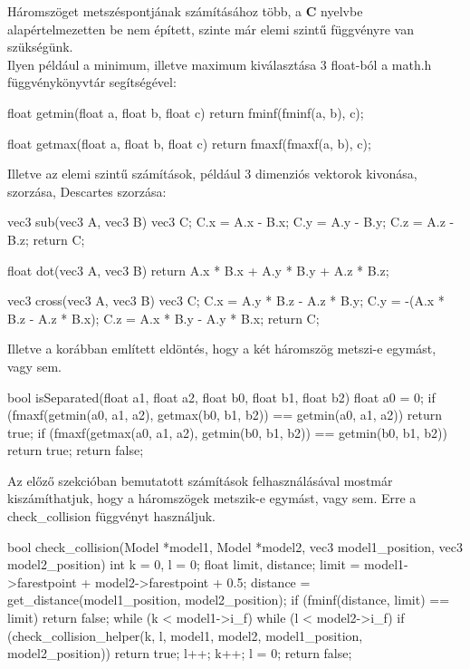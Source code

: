 Háromszöget metszéspontjának számításához több, a \textbf{C} nyelvbe alapértelmezetten be nem épített, szinte már elemi szintű függvényre van szükségünk. \\
Ilyen például a minimum, illetve maximum kiválasztása 3 float-ból a math.h függvénykönyvtár segítségével:

\begin{cpp}
float getmin(float a, float b, float c)
{
    return fminf(fminf(a, b), c);
}

float getmax(float a, float b, float c)
{
    return fmaxf(fmaxf(a, b), c);
}
\end{cpp}
Illetve az elemi szintű számítások, például 3 dimenziós vektorok kivonása, szorzása, Descartes szorzása:

\begin{cpp}
vec3 sub(vec3 A, vec3 B)
{
    vec3 C;
    C.x = A.x - B.x;
    C.y = A.y - B.y;
    C.z = A.z - B.z;
    return C;
}
	
float dot(vec3 A, vec3 B)
{
    return A.x * B.x + A.y * B.y + A.z * B.z;
}
\end{cpp}
\newpage
\begin{cpp}
vec3 cross(vec3 A, vec3 B)
{
    vec3 C;
    C.x = A.y * B.z - A.z * B.y;
    C.y = -(A.x * B.z - A.z * B.x);
    C.z = A.x * B.y - A.y * B.x;
    return C;
}
\end{cpp}
Illetve a korábban említett eldöntés, hogy a két háromszög metszi-e egymást, vagy sem.

\begin{cpp}
bool isSeparated(float a1, float a2, float b0, float b1, float b2)
{
    float a0 = 0;
    if (fmaxf(getmin(a0, a1, a2), getmax(b0, b1, b2)) 
    == getmin(a0, a1, a2))
    {
        return true;
    }
    if (fmaxf(getmax(a0, a1, a2), getmin(b0, b1, b2)) 
    == getmin(b0, b1, b2))
    {
        return true;
    }
    return false;
}
\end{cpp}
\newpage
{}

Az előző szekcióban bemutatott számítások felhasználásával mostmár kiszámíthatjuk, hogy a háromszögek metszik-e egymást, vagy sem. Erre a check\_collision függvényt használjuk.

\begin{cpp}
bool check_collision(Model *model1, Model *model2, vec3 model1_position,
vec3 model2_position)
{
    int k = 0, l = 0;
    float limit, distance;
    limit = model1->farestpoint + model2->farestpoint + 0.5;
    distance = get_distance(model1_position, model2_position);
    if (fminf(distance, limit) == limit)
    {
        return false;
    }
    while (k < model1->i_f)
    {
        while (l < model2->i_f)
        {
            if (check_collision_helper(k, l, model1, model2, 
            model1_position, model2_position))
            {
                return true;
            }
            l++;
        }
        k++;
        l = 0;
    }
    return false;
}
\end{cpp}

